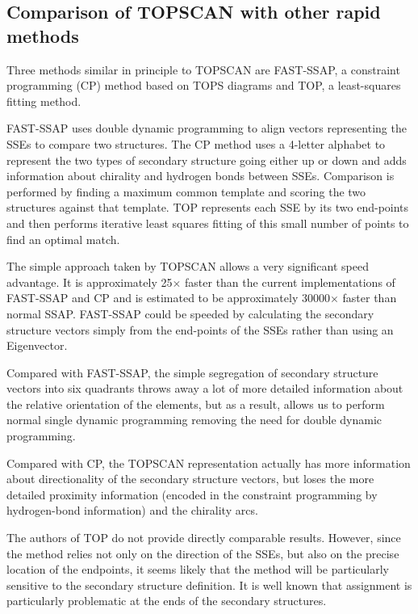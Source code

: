 \documentclass{article}
\begin{document}

\subsection{Comparison of TOPSCAN with other rapid methods}

Three methods similar in principle to TOPSCAN are
FAST-SSAP\cite{taylor:alignment}, a constraint programming (CP) method
based on TOPS diagrams\cite{David_Gilbert_David_Westhead} and TOP, a
least-squares fitting method\cite{lu:top}.

FAST-SSAP uses double dynamic programming to align vectors
representing the SSEs to compare two structures. The CP method uses a
4-letter alphabet to represent the two types of secondary structure
going either up or down and adds information about chirality and
hydrogen bonds between SSEs.  Comparison is performed by finding a
maximum common template and scoring the two structures against that
template.  TOP represents each SSE by its two end-points and then
performs iterative least squares fitting of this small number of
points to find an optimal match.

The simple approach taken by TOPSCAN allows a very significant speed
advantage. It is approximately 25$\times$ faster than the current
implementations of FAST-SSAP and CP and is estimated to be
approximately 30000$\times$ faster than normal SSAP.  FAST-SSAP could
be speeded by calculating the secondary structure vectors simply from
the end-points of the SSEs rather than using an Eigenvector.

Compared with FAST-SSAP, the simple segregation of secondary structure
vectors into six quadrants throws away a lot of more detailed
information about the relative orientation of the elements, but as a
result, allows us to perform normal single dynamic programming
removing the need for double dynamic programming.

Compared with CP, the TOPSCAN representation actually has more
information about directionality of the secondary structure vectors,
but loses the more detailed proximity information (encoded in the
constraint programming by hydrogen-bond information) and the chirality
arcs.

The authors of TOP do not provide directly comparable results.
However, since the method relies not only on the direction of the
SSEs, but also on the precise location of the endpoints, it seems
likely that the method will be particularly sensitive to the secondary
structure definition. It is well known that assignment is particularly
problematic at the ends of the secondary structures.
\end{document}
